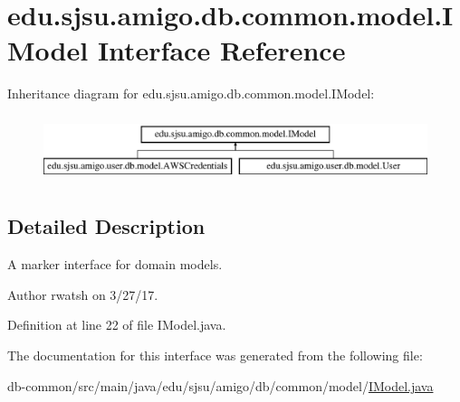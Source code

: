 \hypertarget{interfaceedu_1_1sjsu_1_1amigo_1_1db_1_1common_1_1model_1_1_i_model}{}\section{edu.\+sjsu.\+amigo.\+db.\+common.\+model.\+I\+Model Interface Reference}
\label{interfaceedu_1_1sjsu_1_1amigo_1_1db_1_1common_1_1model_1_1_i_model}
Inheritance diagram for edu.\+sjsu.\+amigo.\+db.\+common.\+model.\+I\+Model\+:\begin{figure}[H]
\begin{center}
\leavevmode
\includegraphics[height=1.971831cm]{interfaceedu_1_1sjsu_1_1amigo_1_1db_1_1common_1_1model_1_1_i_model}
\end{center}
\end{figure}


\subsection{Detailed Description}
A marker interface for domain models.

\begin{DoxyAuthor}{Author}
rwatsh on 3/27/17. 
\end{DoxyAuthor}


Definition at line 22 of file I\+Model.\+java.



The documentation for this interface was generated from the following file\+:\begin{DoxyCompactItemize}
\item 
db-\/common/src/main/java/edu/sjsu/amigo/db/common/model/\hyperlink{_i_model_8java}{I\+Model.\+java}\end{DoxyCompactItemize}
